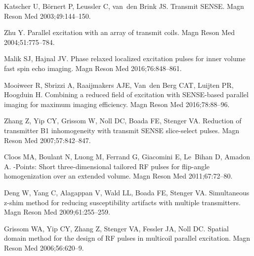 \documentclass[11pt]{article}
\begin{document}

%

\begin{thebibliography}{10}
\providecommand{\url}[1]{\texttt{#1}}
\providecommand{\urlprefix}{URL }

Katscher U, B{\"o}rnert P, Leussler C, van~den Brink JS.
\newblock Transmit {SENSE}.
\newblock Magn Reson Med 2003;\hspace{0pt}49:144--150.

Zhu Y.
\newblock Parallel excitation with an array of transmit coils.
\newblock Magn Reson Med 2004;\hspace{0pt}51:775--784.

Malik SJ, Hajnal JV.
\newblock Phase relaxed localized excitation pulses for inner volume fast spin
  echo imaging.
\newblock Magn Reson Med 2016;\hspace{0pt}76:848--861.

Mooiweer R, Sbrizzi A, Raaijmakers AJE, Van~den Berg CAT, Luijten PR, Hoogduin
  H.
\newblock Combining a reduced field of excitation with {SENSE}-based parallel
  imaging for maximum imaging efficiency.
\newblock Magn Reson Med 2016;\hspace{0pt}78:88--96.

Zhang Z, Yip CY, Grissom W, Noll DC, Boada FE, Stenger VA.
\newblock Reduction of transmitter {B1} inhomogeneity with transmit {SENSE}
  slice-select pulses.
\newblock Magn Reson Med 2007;\hspace{0pt}57:842--847.

Cloos MA, Boulant N, Luong M, Ferrand G, Giacomini E, Le~Bihan D, Amadon A.
-{Points}: {Short} three-dimensional tailored {RF} pulses for
  flip-angle homogenization over an extended volume.
\newblock Magn Reson Med 2011;\hspace{0pt}67:72--80.

Deng W, Yang C, Alagappan V, Wald LL, Boada FE, Stenger VA.
\newblock Simultaneous z-shim method for reducing susceptibility artifacts with
  multiple transmitters.
\newblock Magn Reson Med 2009;\hspace{0pt}61:255--259.

Grissom WA, Yip CY, Zhang Z, Stenger VA, Fessler JA, Noll DC.
\newblock Spatial domain method for the design of {RF} pulses in multicoil
  parallel excitation.
\newblock Magn Reson Med 2006;\hspace{0pt}56:620--9.


\end{thebibliography}
\end{document}
